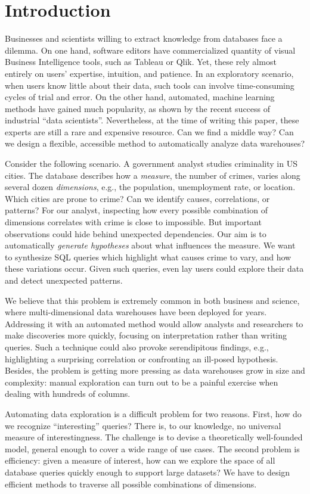 \section{Introduction}
\label{sec:intro}
Businesses and scientists willing to extract knowledge from databases face a
dilemma. On one hand, software editors have commercialized quantity of visual
Business Intelligence tools, such as Tableau or Qlik. Yet, these rely almost
entirely on users' expertise, intuition, and patience. In an exploratory
scenario, when users know little about their data, such tools can involve
time-consuming cycles of trial and error. On the other hand, automated, machine
learning methods have gained much popularity, as shown by the recent success of
industrial ``data scientists''. Nevertheless, at the time of writing this
paper, these experts are still a rare and expensive resource. Can we find a
middle way? Can we design a flexible, accessible method to automatically
analyze data warehouses?

Consider the following scenario. A government analyst studies criminality in US
cities. The database describes how a \emph{measure}, the number of crimes,
varies along several dozen \emph{dimensions}, e.g., the population,
unemployment rate, or location.  Which cities are prone to crime?  Can we
identify causes, correlations, or patterns? For our analyst, inspecting how
every possible combination of dimensions correlates with crime is close to
impossible. But important observations could hide behind unexpected dependencies.
Our aim is to automatically \emph{generate hypotheses} about what influences
the measure.  We want to synthesize SQL queries which highlight what causes
crime to vary, and how these variations occur. Given such queries, even
lay users could explore their data and detect unexpected patterns.

We believe that this problem is extremely common in both business and science,
where multi-dimensional data warehouses have been deployed for years.
Addressing it with an automated method would allow analysts and researchers to
make discoveries more quickly, focusing on interpretation rather than writing
queries. Such a technique could also provoke serendipitous findings, e.g.,
highlighting a surprising correlation or confronting an ill-posed hypothesis.
Besides, the problem is getting more pressing as data warehouses grow in size
and complexity: manual exploration can turn out to be a painful exercise when
dealing with hundreds of columns.

Automating data exploration is a difficult problem for two reasons.  First, how
do we recognize ``interesting'' queries?  There is, to our knowledge, no
universal measure of inte\-restingness. The challenge is to devise a
theoretically well-founded model, general enough to cover a wide range of use
cases. The second problem is efficiency: given a measure of interest, how can
we explore the space of all database queries quickly enough to support large
datasets? We have to design efficient methods to traverse all possible
combinations of dimensions.

